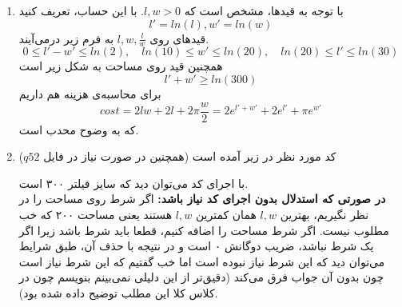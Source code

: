 \begin{enumerate}
	\item 
با توجه به قید‌ها، مشخص است که 
$l, w > 0$.
با این حساب، تعریف کنید
	\[
	l' = ln(l), w' = ln(w)
	\]
قید‌های روی 
$l, w, \frac{l}{w}$
به فرم زیر درمی‌آیند.
	\[
0 \le	l' - w' \le ln(2), \quad ln(10) \le w' \le ln(20), \quad ln(20) \le l' \le ln(30)
	\]
	همچنین قید روی مساحت به شکل زیر است
	\[
	l' + w' \ge ln(300)
	\]
	برای محاسبه‌ی هزینه هم داریم
	\[
	cost = 2lw + 2l + 2\pi\frac{w}{2} = 2e^{l' + w'} + 2e^{l'} + \pi e^{w'}
	\]
	که به وضوح محدب است.
	\item 
	کد مورد نظر در زیر آمده است (همچنین در صورت نیاز در فایل $q52$)
	\begin{latin}
		
	\end{latin}
با اجرای کد می‌توان دید که سایز فیلتر ۳۰۰ است.\\
\textbf{در صورتی که استدلال بدون اجرای کد نیاز باشد:} 
اگر شرط روی مساحت را در نظر نگیریم، بهترین $l, w$ همان کمترین $l, w$ هستند یعنی مساحت ۲۰۰ که خب مطلوب نیست. اگر شرط مساحت را اضافه کنیم، قطعا باید شرط
باشد زیرا اگر یک شرط 
نباشد، ضریب دوگانش ۰ است و در نتیجه با حذف آن، طبق شرایط
می‌توان دید که این شرط نیاز نبوده است اما خب گفتیم که این شرط نیاز است چون بدون آن جواب فرق می‌کند (دقیق‌تر از این دلیلی نمی‌بینم بنویسم چون در کلاس کلا این مطلب توضیح داده شده بود).
\end{enumerate}